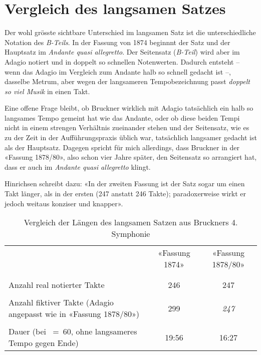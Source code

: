 \section{Vergleich des langsamen Satzes}

Der wohl grösste sichtbare Unterschied im langsamen Satz ist die unterschiedliche Notation des \emph{B-Teils}.
In der Fassung von 1874 beginnnt der Satz und der Hauptsatz im \emph{Andante quasi allegretto}.
Der Seitensatz (\emph{B-Teil}) wird aber im Adagio notiert und in doppelt so schnellen Notenwerten.
Dadurch entsteht -- wenn das Adagio im Vergleich zum Andante halb so schnell gedacht ist --, dasselbe Metrum, aber wegen der langsameren Tempobezeichnung passt \emph{doppelt so viel Musik} in einen Takt.

Eine offene Frage bleibt, ob Bruckner wirklich mit Adagio tatsächlich ein halb so langsames Tempo gemeint hat wie das Andante, oder ob diese beiden Tempi nicht in einem strengen Verhältnis zueinander stehen und der Seitensatz, wie es zu der Zeit in der Aufführungspraxis üblich war, tatsächlich langsamer gedacht ist als der Hauptsatz.
Dagegen spricht für mich allerdings, dass Bruckner in der «Fassung 1878/80», also schon vier Jahre später, den Seitensatz so arrangiert hat, dass er auch im \emph{Andante quasi allegretto} klingt.

Hinrichsen schreibt dazu: «In der zweiten Fassung ist der Satz sogar um einen Takt länger, als in der ersten (247 anstatt 246 Takte); paradoxerweise wirkt er jedoch weitaus konziser und knapper»\autocite[76]{hinrichsen:bruckner}.

\begin{table}[htbp]
	\caption{Vergleich der Längen des langsamen Satzen aus Bruckners 4. Symphonie}
	\label{tab:duration}
	\centering
	\begin{tabular}{p{5.5cm}|cc}
		& «Fassung 1874» & «Fassung 1878/80» \\
		&& \\[-0.5em]
		\hline
		&& \\[-0.5em]
		Anzahl real notierter Takte & 246 & 247 \\
		&& \\[-0.5em]
		Anzahl fiktiver Takte \small{(Adagio angepasst wie in «Fassung 1878/80»)} & 299 & \emph{247} \\
		&& \\[-0.5em]
		Dauer \small{(bei \quarternote~=~60, ohne langsameres Tempo gegen Ende)} & 19:56 & 16:27 \\
	\end{tabular}
\end{table}

